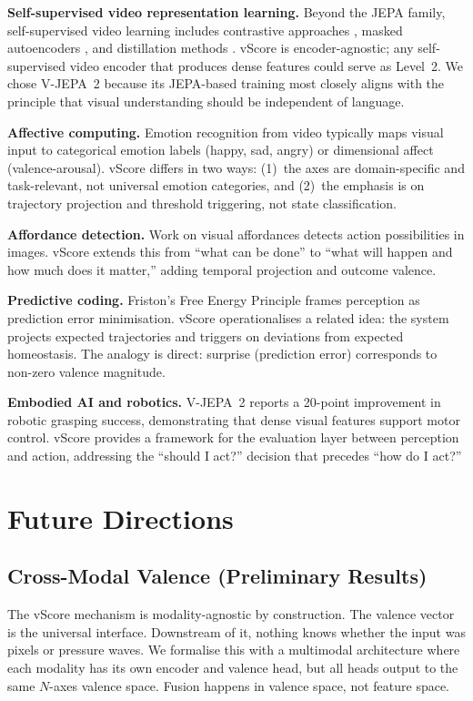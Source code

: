 \documentclass[11pt]{article}
\begin{document}
\textbf{Self-supervised video representation learning.} Beyond the JEPA family, self-supervised video learning includes contrastive approaches \citep{qian2021}, masked autoencoders \citep{tong2022,wang2023}, and distillation methods \citep{oquab2023}. vScore is encoder-agnostic; any self-supervised video encoder that produces dense features could serve as Level~2. We chose V-JEPA~2 because its JEPA-based training most closely aligns with the principle that visual understanding should be independent of language.

\textbf{Affective computing.} Emotion recognition from video \citep{mollahosseini2017,li2020} typically maps visual input to categorical emotion labels (happy, sad, angry) or dimensional affect (valence-arousal). vScore differs in two ways: (1)~the axes are domain-specific and task-relevant, not universal emotion categories, and (2)~the emphasis is on trajectory projection and threshold triggering, not state classification.

\textbf{Affordance detection.} Work on visual affordances \citep{nagarajan2019,luo2022} detects action possibilities in images. vScore extends this from ``what can be done'' to ``what will happen and how much does it matter,'' adding temporal projection and outcome valence.

\textbf{Predictive coding.} Friston's Free Energy Principle \citep{friston2010} frames perception as prediction error minimisation. vScore operationalises a related idea: the system projects expected trajectories and triggers on deviations from expected homeostasis. The analogy is direct: surprise (prediction error) corresponds to non-zero valence magnitude.

\textbf{Embodied AI and robotics.} V-JEPA~2 reports a 20-point improvement in robotic grasping success, demonstrating that dense visual features support motor control. vScore provides a framework for the evaluation layer between perception and action, addressing the ``should I act?'' decision that precedes ``how do I act?''

\section{Future Directions}

\subsection{Cross-Modal Valence (Preliminary Results)}

The vScore mechanism is modality-agnostic by construction. The valence vector is the universal interface. Downstream of it, nothing knows whether the input was pixels or pressure waves. We formalise this with a multimodal architecture where each modality has its own encoder and valence head, but all heads output to the same $N$-axes valence space. Fusion happens in valence space, not feature space.
\end{document}
